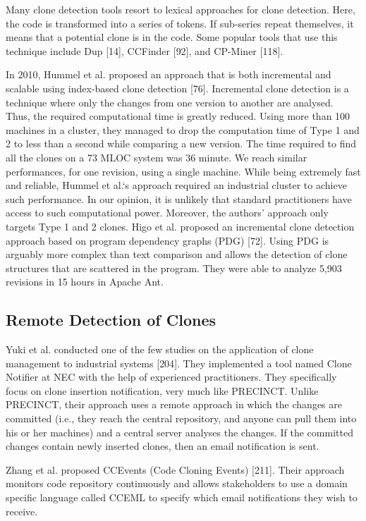 \documentclass[12pt]{report}
\begin{document}
Many clone detection tools resort to lexical approaches for clone
detection. Here, the code is transformed into a series of tokens. If
sub-series repeat themselves, it means that a potential clone is in the
code. Some popular tools that use this technique include Dup {[}14{]},
CCFinder {[}92{]}, and CP-Miner {[}118{]}.

In 2010, Hummel et al. proposed an approach that is both incremental and
scalable using index-based clone detection {[}76{]}. Incremental clone
detection is a technique where only the changes from one version to
another are analysed. Thus, the required computational time is greatly
reduced. Using more than 100 machines in a cluster, they managed to drop
the computation time of Type 1 and 2 to less than a second while
comparing a new version. The time required to find all the clones on a
73 MLOC system was 36 minute. We reach similar performances, for one
revision, using a single machine. While being extremely fast and
reliable, Hummel et al.`s approach required an industrial cluster to
achieve such performance. In our opinion, it is unlikely that standard
practitioners have access to such computational power. Moreover, the
authors' approach only targets Type 1 and 2 clones. Higo et al. proposed
an incremental clone detection approach based on program dependency
graphs (PDG) {[}72{]}. Using PDG is arguably more complex than text
comparison and allows the detection of clone structures that are
scattered in the program. They were able to analyze 5,903 revisions in
15 hours in Apache Ant.

\subsection{Remote Detection of
Clones}\label{remote-detection-of-clones}

Yuki et al. conducted one of the few studies on the application of clone
management to industrial systems {[}204{]}. They implemented a tool
named Clone Notifier at NEC with the help of experienced practitioners.
They specifically focus on clone insertion notification, very much like
PRECINCT. Unlike PRECINCT, their approach uses a remote approach in
which the changes are committed (i.e., they reach the central
repository, and anyone can pull them into his or her machines) and a
central server analyses the changes. If the committed changes contain
newly inserted clones, then an email notification is sent.

Zhang et al. proposed CCEvents (Code Cloning Events) {[}211{]}. Their
approach monitors code repository continuously and allows stakeholders
to use a domain specific language called CCEML to specify which email
notifications they wish to receive.
\end{document}
